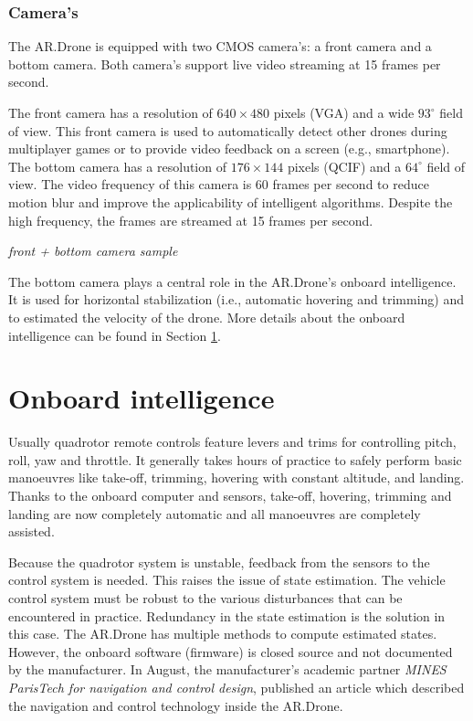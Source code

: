 \subsubsection{Camera's}
The AR.Drone is equipped with two CMOS camera's: a front camera and a bottom camera.
Both camera's support live video streaming at 15 frames per second.

The front camera has a resolution of $640 \times 480$ pixels (VGA) and a wide $93^{\circ}$ field of view.
This front camera is used to automatically detect other drones during multiplayer games or to provide video feedback on a screen (e.g., smartphone).
The bottom camera has a resolution of $176 \times 144$ pixels (QCIF) and a $64^{\circ}$ field of view.
The video frequency of this camera is 60 frames per second to reduce motion blur and improve the applicability of intelligent algorithms.
Despite the high frequency, the frames are streamed at 15 frames per second.

\textit{front + bottom camera sample}

The bottom camera plays a central role in the AR.Drone's onboard intelligence.
It is used for horizontal stabilization (i.e., automatic hovering and trimming) and to estimated the velocity of the drone.
More details about the onboard intelligence can be found in Section \ref{sec:platform_onboard_intelligence}.



\section{Onboard intelligence}
\label{sec:platform_onboard_intelligence}
Usually quadrotor remote controls feature levers and trims for controlling pitch, roll, yaw and throttle.
It generally takes hours of practice to safely perform basic manoeuvres like take-off, trimming, hovering with constant altitude, and landing.
Thanks to the onboard computer and sensors, take-off, hovering, trimming and landing are now completely automatic and all manoeuvres are completely assisted.

Because the quadrotor system is unstable, feedback from the sensors to the control system is needed.
This raises the issue of state estimation.
The vehicle control system must be robust to the various disturbances that can be encountered in practice.
Redundancy in the state estimation is the solution in this case.
The AR.Drone has multiple methods to compute estimated states.
However, the onboard software (firmware) is closed source and not documented by the manufacturer.
In August, the manufacturer's academic partner \textit{MINES ParisTech for navigation and control design}, published an article \cite{bristeau2011navigation} which described the navigation and control technology inside the AR.Drone.



